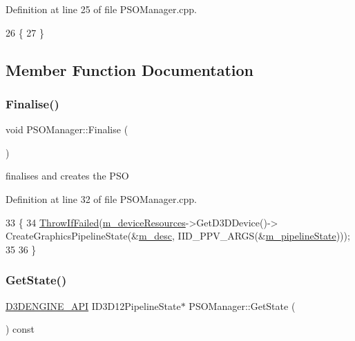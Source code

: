 Definition at line 25 of file P\+S\+O\+Manager.\+cpp.


\begin{DoxyCode}
26 \{
27 \}
\end{DoxyCode}


\subsection{Member Function Documentation}
\mbox{\label{class_p_s_o_manager_ad8091fe85d4e765ad6c979f891bc053b}} 
\subsubsection{\texorpdfstring{Finalise()}{Finalise()}}
{\footnotesize\ttfamily void P\+S\+O\+Manager\+::\+Finalise (\begin{DoxyParamCaption}{ }\end{DoxyParamCaption})}



finalises and creates the P\+SO 



Definition at line 32 of file P\+S\+O\+Manager.\+cpp.


\begin{DoxyCode}
33 \{
34     \mbox{\hyperlink{_direct_x_helper_8h_abca3eeca6b5772a1112e0a9a9e3d9013}{ThrowIfFailed}}(\mbox{\hyperlink{class_p_s_o_manager_a0ea4be81328632e56d764e065b2af0af}{m\_deviceResources}}->GetD3DDevice()->
      CreateGraphicsPipelineState(&\mbox{\hyperlink{class_p_s_o_manager_ac5a7e346b2d641709d7146f5a0f45dee}{m\_desc}}, IID\_PPV\_ARGS(&\mbox{\hyperlink{class_p_s_o_manager_aa34b6aa764012d33591474b456d1bfb7}{m\_pipelineState}})));
35 
36 \}
\end{DoxyCode}
\mbox{\label{class_p_s_o_manager_ab635262aed53ba34b91ae15224808254}} 
\subsubsection{\texorpdfstring{Get\+State()}{GetState()}}
{\footnotesize\ttfamily \mbox{\hyperlink{stdafx_8h_a8ee2d990c5dfba7794dd2b60741d7722}{D3\+D\+E\+N\+G\+I\+N\+E\+\_\+\+A\+PI}} I\+D3\+D12\+Pipeline\+State$\ast$ P\+S\+O\+Manager\+::\+Get\+State (\begin{DoxyParamCaption}{ }\end{DoxyParamCaption}) const\hspace{0.3cm}{\ttfamily [inline]}}




